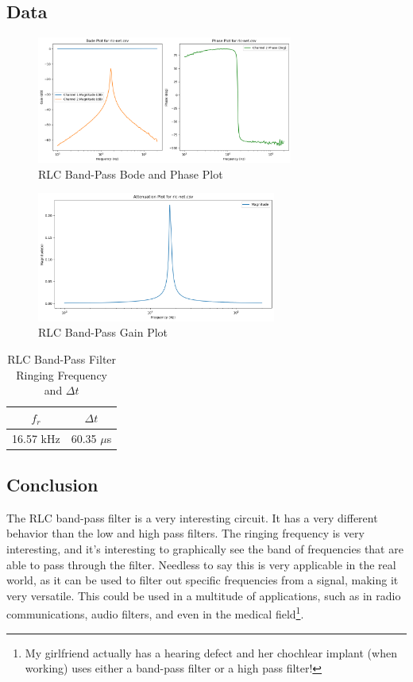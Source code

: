 \documentclass{article}
\begin{document}
\subsection{Data}
\begin{figure}[h!]
    \centering
    \includegraphics[width=0.75\textwidth]{Images/rlc-bode.png}
    \caption{RLC Band-Pass Bode and Phase Plot}
    \label{fig:RLC Bode Plot}
\end{figure}
\begin{figure}[H]
    \centering
    \includegraphics[width=0.7\textwidth]{Images/rlc-gain.png}
    \caption{RLC Band-Pass Gain Plot}
    \label{fig:RLC Gain Plot}
\end{figure}
\begin{table}[h!]
    \centering
    \begin{tabular}{|c|c|}
        \hline
        $f_r$ & $\Delta t$\\
        \hline
        16.57 kHz & 60.35 $\mu$s\\
        \hline
    \end{tabular}
    \caption{RLC Band-Pass Filter Ringing Frequency and $\Delta t$}
    \label{tab:RLC freq}
\end{table}
\subsection{Conclusion}
The RLC band-pass filter is a very interesting circuit. It has a very different behavior than the low and high pass filters. The ringing frequency is very interesting, and it's interesting to graphically see the band of frequencies that are able to pass through the filter. Needless to say this is very applicable in the real world, as it can be used to filter out specific frequencies from a signal, making it very versatile. This could be used in a multitude of applications, such as in radio communications, audio filters, and even in the medical field\footnote{My girlfriend actually has a hearing defect and her chochlear implant (when working) uses either a band-pass filter or a high pass filter!}.
\end{document}
